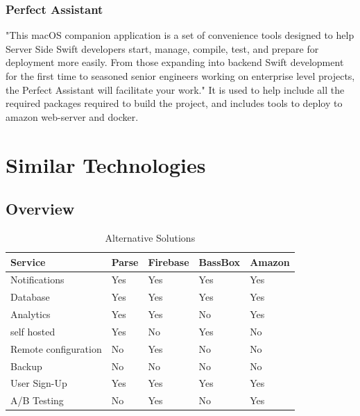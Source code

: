 \subsubsection{Perfect Assistant}
"This macOS companion application is a set of convenience tools designed to help Server Side Swift developers start, manage, compile, test, and prepare for deployment more easily. From those expanding into backend Swift development for the first time to seasoned senior engineers working on enterprise level projects, the Perfect Assistant will facilitate your work." \cite{perfectAssist} It is used to help include all the required packages required to build the project, and includes tools to deploy to amazon web-server and docker.



\section{Similar Technologies}

\subsection{Overview}

\begin{table}[h]
\centering
\caption{Alternative Solutions}
\label{fig:overview}
\begin{tabular}{|l|l|l|l|l|}
\hline
\cellcolor{green!20}Service &\cellcolor{green!20}Parse &\cellcolor{green!20}Firebase &\cellcolor{green!20}BassBox &\cellcolor{green!20}Amazon \\ \hline
Notifications               & Yes                      & Yes                         & Yes                        & Yes\\ \hline
Database                    & Yes                      & Yes                         & Yes                        & Yes\\ \hline
Analytics                   & Yes                      & Yes                         & No                         & Yes\\ \hline
self hosted                 & Yes                      & No                          & Yes                        & No \\ \hline
Remote configuration        & No                       & Yes                         & No                         & No \\ \hline
Backup                      & No                       & No                          & No                         & No \\ \hline
User Sign-Up                & Yes                      & Yes                         & Yes                        & Yes\\ \hline
A/B Testing                 & No                       & Yes                         & No                         & Yes\\ \hline
\end{tabular}
\end{table}


